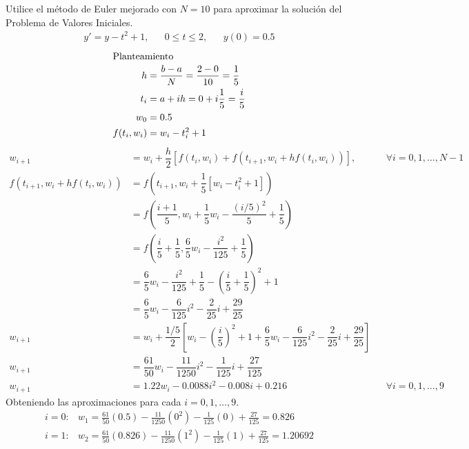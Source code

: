 \begin{exerciseT}{\rm
	Utilice el método de Euler mejorado con $N=10$ para aproximar la solución del Problema de Valores Iniciales.
	\begin{align*}
		y'=y-t^2+1, && 0\leq t\leq 2, && y(0)=0.5
	\end{align*}
	\begin{align*}
		\intertext{Planteamiento}
		h &= \dfrac{b-a}{N} = \dfrac{2-0}{10} = \dfrac{1}{5}\\
		t_i &= a+ih = 0+ i\dfrac{1}{5} = \dfrac{i}{5}\\
		w_0 &= 0.5\\
		f(t_i,w_i) &= w_i-t_i^2+1
	\end{align*}
	\begin{align*}
		w_{i+1} &= w_i + \dfrac{h}{2}\left[f(t_i,w_i) + f(t_{i+1}, w_i + hf(t_i,w_i))\right], && \forall i=0,1,\dots,N-1\\
		f(t_{i+1}, w_i + hf(t_i,w_i)) &= f\left(t_{i+1}, w_i + \dfrac{1}{5}\left[w_i - t_i^2 + 1 \right]\right)\\
			&= f\left(\dfrac{i+1}{5}, w_i + \dfrac{1}{5}w_i - \dfrac{(i/5)^2}{5} + \dfrac{1}{5} \right)\\
			&= f\left(\dfrac{i}{5}+\dfrac{1}{5}, \dfrac{6}{5}w_i - \dfrac{i^2}{125} + \dfrac{1}{5} \right)\\
			&= \dfrac{6}{5}w_i - \dfrac{i^2}{125} + \dfrac{1}{5} - \left(\dfrac{i}{5}+\dfrac{1}{5}\right)^2+1\\
			&= \dfrac{6}{5}w_i - \dfrac{6}{125}i^2 - \dfrac{2}{25}i + \dfrac{29}{25}\\
		w_{i+1} &= w_i + \dfrac{1/5}{2}\left[w_i - \left(\dfrac{i}{5}\right)^2 + 1 + \dfrac{6}{5}w_i - \dfrac{6}{125}i^2 - \dfrac{2}{25}i 
			+ \dfrac{29}{25} \right]\\
		w_{i+1} &= \dfrac{61}{50}w_i - \dfrac{11}{1250}i^2 - \dfrac{1}{125}i + \dfrac{27}{125}\\
		w_{i+1} &= 1.22w_i - 0.0088i^2 - 0.008i + 0.216 && \forall i=0,1,\dots,9
	\end{align*}
	Obteniendo las aproximaciones para cada $i=0,1,\dots ,9$.
	\[\begin{array}{ll}
		i=0: & w_1 = \frac{61}{50}(0.5) - \frac{11}{1250}(0^2) - \frac{1}{125}(0) + \frac{27}{125} = 0.826\\
		i=1: & w_2 = \frac{61}{50}(0.826) - \frac{11}{1250}(1^2) - \frac{1}{125}(1) + \frac{27}{125} = 1.20692
	\end{array}\]
	\begin{table}[H]
		\centering
		\begin{tabular}{ccc}

\end{tabular}
\end{table}}
\end{exerciseT}
